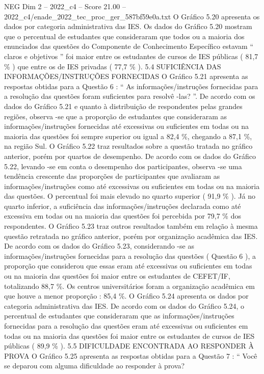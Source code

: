 \begin{textsample}{NEG Dim 2 – 2022\_c4 – Score 21.00 – 2022\_c4/enade\_2022\_tec\_proc\_ger\_587bf59e0a.txt}
O Gráfico 5.20 apresenta os dados por categoria administrativa das IES.
Os dados do Gráfico 5.20 mostram que o percentual de estudantes que consideraram que todos ou a maioria dos enunciados das questões do Componente de Conhecimento Específico estavam “ claros e objetivos ” foi maior entre os estudantes de cursos de IES públicas ( 81,7 \% ) que entre os de IES privadas ( 77,7 \% ). 5.4 SUFICIÊNCIA DAS INFORMAÇÕES/INSTRUÇÕES FORNECIDAS O Gráfico 5.21 apresenta as respostas obtidas para a Questão 6 : “ As informações/instruções fornecidas para a resolução das questões foram suficientes para resolvê -las? ”.
De acordo com os dados do Gráfico 5.21 e quanto à distribuição de respondentes pelas grandes regiões, observa -se que a proporção de estudantes que consideraram as informações/instruções fornecidas até excessivas ou suficientes em todas ou na maioria das questões foi sempre superior ou igual a 82,4 \%, chegando a 87,1 \%, na região Sul.
O Gráfico 5.22 traz resultados sobre a questão tratada no gráfico anterior, porém por quartos de desempenho.
De acordo com os dados do Gráfico 5.22, levando -se em conta o desempenho dos participantes, observa -se uma tendência crescente das proporções de participantes que avaliaram as informações/instruções como até excessivas ou suficientes em todas ou na maioria das questões.
O percentual foi mais elevado no quarto superior ( 91,9 \% ).
Já no quarto inferior, a suficiência das informações/instruções declarada como até excessiva em todas ou na maioria das questões foi percebida por 79,7 \% dos respondentes.
O Gráfico 5.23 traz outros resultados também em relação à mesma questão retratada no gráfico anterior, porém por organização acadêmica das IES.
De acordo com os dados do Gráfico 5.23, considerando -se as informações/instruções fornecidas para a resolução das questões ( Questão 6 ), a proporção que considerou que essas eram até excessivas ou suficientes em todas ou na maioria das questões foi maior entre os estudantes de CEFET/IF, totalizando 88,7 \%.
Os centros universitários foram a organização acadêmica em que houve a menor proporção : 85,4 \%.
O Gráfico 5.24 apresenta os dados por categoria administrativa das IES.
De acordo com os dados do Gráfico 5.24, o percentual de estudantes que consideraram que as informações/instruções fornecidas para a resolução das questões eram até excessivas ou suficientes em todas ou na maioria das questões foi maior entre os estudantes de cursos de IES públicas ( 89,9 \% ). 5.5 DIFICULDADE ENCONTRADA AO RESPONDER À PROVA O Gráfico 5.25 apresenta as respostas obtidas para a Questão 7 : “ Você se deparou com alguma dificuldade ao responder à prova?

\end{textsample}
